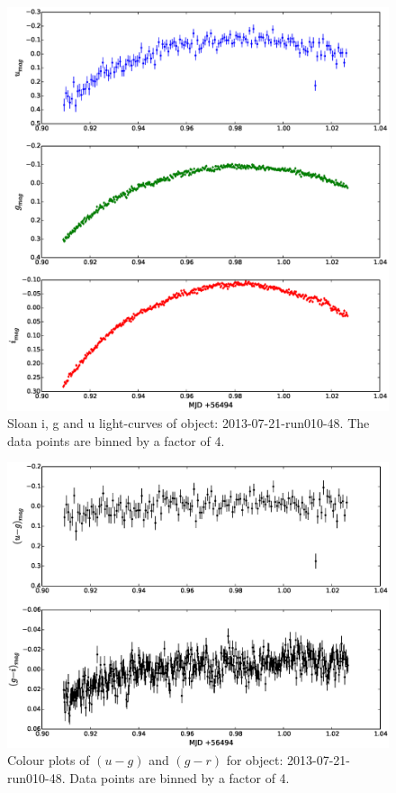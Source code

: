 \begin{figure}
  \includegraphics[width=120mm]{images/2013-07-21-run010-48_lightcurve-bin4.eps} 
  \caption{Sloan i, g and u light-curves of object: 2013-07-21-run010-48. The data points are binned by a factor of 4.}
  \label{fig:2013-07-21-run010-48}
\end{figure}

\begin{figure}
  \center
  \includegraphics[width=120mm]{images/2013-07-21-run010-48_colourcurve-bin4.eps}
  \caption{Colour plots of $(u-g)$ and $(g-r)$ for object: 2013-07-21-run010-48. Data points are binned by a factor of 4.}
  \label{fig:2013-07-21-run010-48-colour}
\end{figure}


